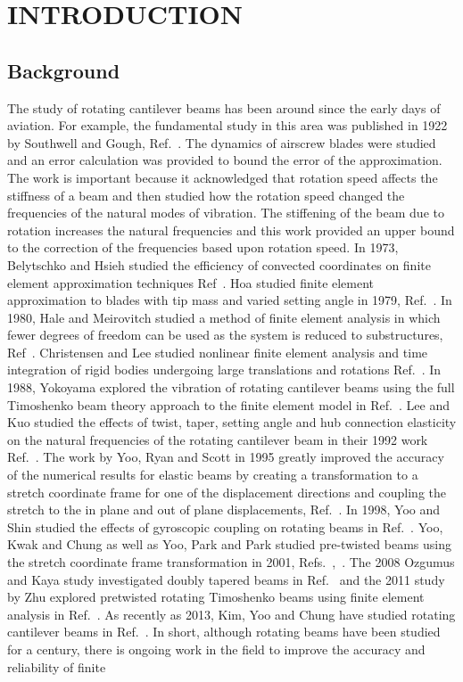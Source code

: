 \chapter{INTRODUCTION}
\label{chap:intro}

\section{Background}
The study of rotating cantilever beams has been around since the early days of aviation. For example, the fundamental study in this area was published in 1922 by Southwell and Gough, Ref.~\cite{southwell1922free}. The dynamics of airscrew blades were studied and an error calculation was provided to bound the error of the approximation. The work is important because it acknowledged that rotation speed affects the stiffness of a beam and then studied how the rotation speed changed the frequencies of the natural modes of vibration. The stiffening of the beam due to rotation increases the natural frequencies and this work provided an upper bound to the correction of the frequencies based upon rotation speed. In 1973, Belytschko and Hsieh studied the efficiency of convected coordinates on finite element approximation techniques Ref~\cite{belytschko1973non}. Hoa studied finite element approximation to blades with tip mass and varied setting angle in 1979, Ref.~\cite{hoa1979vibration}. In 1980, Hale and Meirovitch studied a method of finite element analysis in which fewer degrees of freedom can be used as the system is reduced to substructures, Ref~\cite{hale1980general}. Christensen and Lee studied nonlinear finite element analysis and time integration of rigid bodies undergoing large translations and rotations Ref.~\cite{christensen1986nonlinear}. In 1988, Yokoyama explored the vibration of rotating cantilever beams using the full Timoshenko beam theory approach to the finite element model in Ref.~\cite{yokoyama1988free}. Lee and Kuo studied the effects of twist, taper, setting angle and hub connection elasticity on the natural frequencies of the rotating cantilever beam in their 1992 work Ref.~\cite{lee1992bending}. The work by Yoo, Ryan and Scott in 1995 greatly improved the accuracy of the numerical results for elastic beams by creating a transformation to a stretch coordinate frame for one of the displacement directions and coupling the stretch to the in plane and out of plane displacements, Ref.~\cite{yoo1995dynamics}. In 1998, Yoo and Shin studied the effects of gyroscopic coupling on rotating beams in Ref.~\cite{yoo1998shin}. Yoo, Kwak and Chung as well as Yoo, Park and Park studied pre-twisted beams using the stretch coordinate frame transformation in 2001, Refs.~\cite{yoo2001twist},~\cite{yoo2001parkpark}. The 2008 Ozgumus and Kaya study investigated doubly tapered beams in Ref.~\cite{ozgumus2008flapwise} and the 2011 study by Zhu explored pretwisted rotating Timoshenko beams using finite element analysis in Ref.~\cite{zhu2011vibrations}. As recently as 2013, Kim, Yoo and Chung have studied rotating cantilever beams in Ref.~\cite{kim2013dynamic}. In short, although rotating beams have been studied for a century, there is ongoing work in the field to improve the accuracy and reliability of finite 